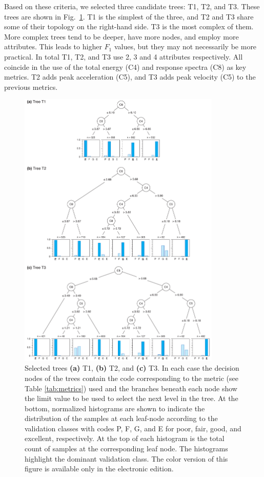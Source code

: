 Based on these criteria, we selected three candidate trees: T1, T2, and T3. These trees are shown in Fig.~\ref{fig:trees}. T1 is the simplest of the three, and T2 and T3 share some of their topology on the right-hand side. T3 is the most complex of them. More complex trees tend to be deeper, have more nodes, and employ more attributes. This leads to higher $F_1$ values, but they may not necessarily be more practical. In total T1, T2, and T3 use 2, 3 and 4 attributes respectively. All coincide in the use of the total energy (C4) and response spectra (C8) as key metrics. T2 adds peak acceleration (C5), and T3 adds peak velocity (C5) to the previous metrics.

\begin{figure}
	\centering
	\includegraphics[width=0.86\textwidth]{figures/pdf/figure-09}
	\caption{Selected trees \textbf{(a)} T1, \textbf{(b)} T2, and \textbf{(c)} T3. In each case the decision nodes of the trees contain the code corresponding to the metric (see Table \ref{tab:metrics}) used and the branches beneath each node show the limit value to be used to select the next level in the tree. At the bottom, normalized histograms are shown to indicate the distribution of the samples at each leaf-node according to the validation classes with codes P, F, G, and E for poor, fair, good, and excellent, respectively. At the top of each histogram is the total count of samples at the corresponding leaf node. The histograms highlight the dominant validation class. The color version of this figure is available only in the electronic edition.}
	\label{fig:trees}
\end{figure}

